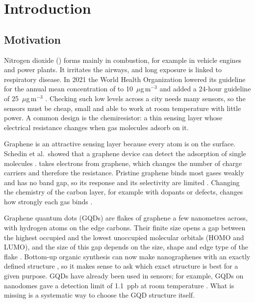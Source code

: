 \chapter{Introduction}
\label{ch:intro}

\section{Motivation}

Nitrogen dioxide () forms mainly in combustion, for example in vehicle engines and power
plants. It irritates the airways, and long exposure is linked to respiratory disease. In 2021 the
World Health Organization lowered its guideline for the annual mean concentration of  to
10~\(\mu\)g\,m\(^{-3}\) and added a 24-hour guideline of 25~\(\mu\)g\,m\(^{-3}\)
\cite{who2021aqg}. Checking such low levels across a city needs many sensors, so the sensors must
be cheap, small and able to work at room temperature with little power. A common design is the
chemiresistor: a thin sensing layer whose electrical resistance changes when gas molecules adsorb
on it.

Graphene is an attractive sensing layer because every atom is on the surface. Schedin et
al.\ showed that a graphene device can detect the adsorption of single  molecules
\cite{schedin2007detection}.  takes electrons from graphene, which changes the number of
charge carriers and therefore the resistance. Pristine graphene binds most gases weakly and has
no band gap, so its response and its selectivity are limited \cite{leenaerts2008adsorption}.
Changing the chemistry of the carbon layer, for example with dopants or defects, changes how
strongly each gas binds \cite{zhang2009dopants,yuan2013graphene}.

Graphene quantum dots (GQDs) are flakes of graphene a few nanometres across, with hydrogen atoms
on the edge carbons. Their finite size opens a gap between the highest occupied and the lowest
unoccupied molecular orbitals (HOMO and LUMO), and the size of this gap depends on the size,
shape and edge type of the flake \cite{ponomarenko2008,bacon2014gqd}. Bottom-up organic synthesis
can now make nanographenes with an exactly defined structure \cite{yan2010large,narita2015nanographene},
so it makes sense to ask which exact structure is best for a given purpose. GQDs have already
been used in  sensors; for example, GQDs on  nanodomes gave a detection limit of
1.1~ppb at room temperature \cite{lee2023gqdsno2}. What is missing is a systematic way to choose
the GQD structure itself.

